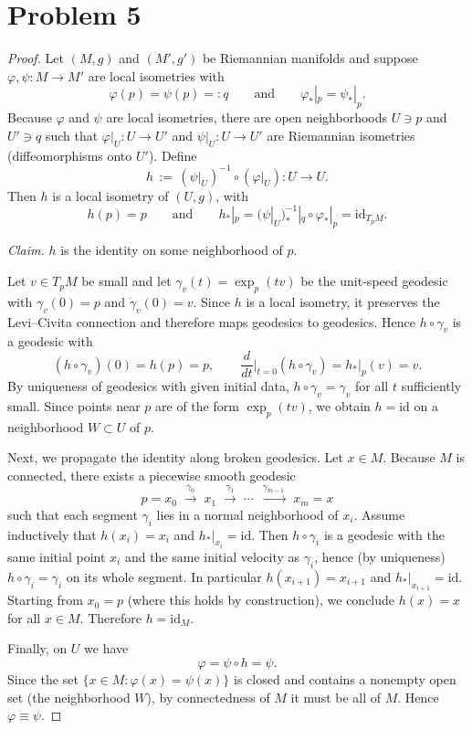 \documentclass[12pt]{article}
\begin{document}
\section*{Problem 5}
\begin{proof}
  Let $(M,g)$ and $(M',g')$ be Riemannian manifolds and suppose
$\varphi,\psi:M\to M'$ are local isometries with
\[
\varphi(p)=\psi(p)=:q
\qquad\text{and}\qquad
\varphi_{*}|_{p}=\psi_{*}|_{p}.
\]
Because $\varphi$ and $\psi$ are local isometries, there are open
neighborhoods $U\ni p$ and $U'\ni q$ such that
$\varphi|_U:U\to U'$ and $\psi|_U:U\to U'$ are Riemannian isometries
(diffeomorphisms onto $U'$). Define
\[
h \,:=\, (\psi|_U)^{-1}\circ (\varphi|_U): U \longrightarrow U .
\]
Then $h$ is a local isometry of $(U,g)$, with
\[
h(p)=p
\qquad\text{and}\qquad
h_{*}|_{p}=(\psi|_U)^{-1}_{*}|_{q}\circ \varphi_{*}|_{p}=\mathrm{id}_{T_pM}.
\]

\medskip\noindent
\emph{Claim.} $h$ is the identity on some neighborhood of $p$.

\smallskip
Let $v\in T_pM$ be small and let $\gamma_v(t)=\exp_p(tv)$ be the unit-speed
geodesic with $\gamma_v(0)=p$ and $\dot\gamma_v(0)=v$. Since $h$ is a local
isometry, it preserves the Levi--Civita connection and therefore maps geodesics
to geodesics. Hence $h\circ\gamma_v$ is a geodesic with
\[
(h\circ\gamma_v)(0)=h(p)=p, \qquad
\frac{d}{dt}\Big|_{t=0} (h\circ\gamma_v)=h_{*}|_{p}(v)=v .
\]
By uniqueness of geodesics with given initial data, $h\circ\gamma_v=\gamma_v$
for all $t$ sufficiently small. Since points near $p$ are of the form
$\exp_p(tv)$, we obtain $h=\mathrm{id}$ on a neighborhood $W\subset U$ of $p$.

\medskip
Next, we propagate the identity along broken geodesics. Let $x\in M$. Because
$M$ is connected, there exists a piecewise smooth geodesic
\[
p=x_0 \;\xrightarrow{\ \gamma_0\ }\; x_1
\;\xrightarrow{\ \gamma_1\ }\; \cdots \;
\xrightarrow{\ \gamma_{m-1}\ }\; x_m=x
\]
such that each segment $\gamma_i$ lies in a normal neighborhood of $x_i$.
Assume inductively that $h(x_i)=x_i$ and $h_{*}|_{x_i}=\mathrm{id}$. Then
$h\circ\gamma_i$ is a geodesic with the same initial point $x_i$ and the same
initial velocity as $\gamma_i$, hence (by uniqueness) $h\circ\gamma_i=\gamma_i$
on its whole segment. In particular $h(x_{i+1})=x_{i+1}$ and
$h_{*}|_{x_{i+1}}=\mathrm{id}$. Starting from $x_0=p$ (where this holds by
construction), we conclude $h(x)=x$ for all $x\in M$. Therefore $h=\mathrm{id}_M$.

Finally, on $U$ we have
\[
\varphi = \psi\circ h = \psi .
\]
Since the set $\{x\in M:\varphi(x)=\psi(x)\}$ is closed and contains a
nonempty open set (the neighborhood $W$), by connectedness of $M$ it must be
all of $M$. Hence $\varphi\equiv\psi$.
\end{proof}
\end{document}
